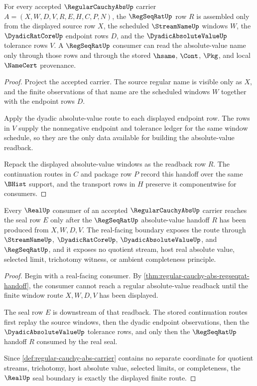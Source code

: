 \begin{theorem}
\label{thm:regular-cauchy-abs-regseqrat-handoff}
For every accepted $\RegularCauchyAbsUp$ carrier $A=(X,W,D,V,R,E,H,C,P,N)$, the $\RegSeqRatUp$ row $R$ is assembled only from the displayed source row $X$, the scheduled $\StreamNameUp$ windows $W$, the $\DyadicRatCoreUp$ endpoint rows $D$, and the $\DyadicAbsoluteValueUp$ tolerance rows $V$. A $\RegSeqRatUp$ consumer can read the absolute-value name only through those rows and through the stored $\hsame$, $\Cont$, $\Pkg$, and local $\NameCert$ provenance.
\end{theorem}
\begin{proof}
Project the accepted carrier. The source regular name is visible only as $X$, and the finite observations of that name are the scheduled windows $W$ together with the endpoint rows $D$.

Apply the dyadic absolute-value route to each displayed endpoint row. The rows in $V$ supply the nonnegative endpoint and tolerance ledger for the same window schedule, so they are the only data available for building the absolute-value readback.

Repack the displayed absolute-value windows as the readback row $R$. The continuation routes in $C$ and package row $P$ record this handoff over the same $\BHist$ support, and the transport rows in $H$ preserve it componentwise for consumers.
\end{proof}

\begin{theorem}
\label{thm:regular-cauchy-abs-real-seal-boundary}
Every $\RealUp$ consumer of an accepted $\RegularCauchyAbsUp$ carrier reaches the seal row $E$ only after the $\RegSeqRatUp$ absolute-value handoff $R$ has been produced from $X,W,D,V$. The real-facing boundary exposes the route through $\StreamNameUp$, $\DyadicRatCoreUp$, $\DyadicAbsoluteValueUp$, and $\RegSeqRatUp$, and it exposes no quotient stream, host real absolute value, selected limit, trichotomy witness, or ambient completeness principle.
\end{theorem}
\begin{proof}
Begin with a real-facing consumer. By \autoref{thm:regular-cauchy-abs-regseqrat-handoff}, the consumer cannot reach a regular absolute-value readback until the finite window route $X,W,D,V$ has been displayed.

The seal row $E$ is downstream of that readback. The stored continuation routes first replay the source windows, then the dyadic endpoint observations, then the $\DyadicAbsoluteValueUp$ tolerance rows, and only then the $\RegSeqRatUp$ handoff $R$ consumed by the real seal.

Since \autoref{def:regular-cauchy-abs-carrier} contains no separate coordinate for quotient streams, trichotomy, host absolute value, selected limits, or completeness, the $\RealUp$ seal boundary is exactly the displayed finite route.
\end{proof}


